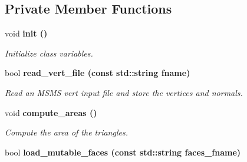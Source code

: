 \subsection*{Private Member Functions}
\begin{CompactItemize}
\item 
void \bf{init} ()\label{classSimSite3D_1_1geometry_1_1SimpleTrimeshTwo_5f901fae358571cee8e66c7f4480e4f6}

\begin{CompactList}\small\item\em Initialize class variables. \item\end{CompactList}\item 
bool \bf{read\_\-vert\_\-file} (const std::string fname)\label{classSimSite3D_1_1geometry_1_1SimpleTrimeshTwo_32143f4bf17902caa35ffd5951dd9b95}

\begin{CompactList}\small\item\em Read an MSMS vert input file and store the vertices and normals. \item\end{CompactList}\item 
void \bf{compute\_\-areas} ()\label{classSimSite3D_1_1geometry_1_1SimpleTrimeshTwo_46ee622d183ec4cdf3f7b37e490e8c45}

\begin{CompactList}\small\item\em Compute the area of the triangles. \item\end{CompactList}\item 
bool \bf{load\_\-mutable\_\-faces} (const std::string faces\_\-fname)
\end{CompactItemize}
